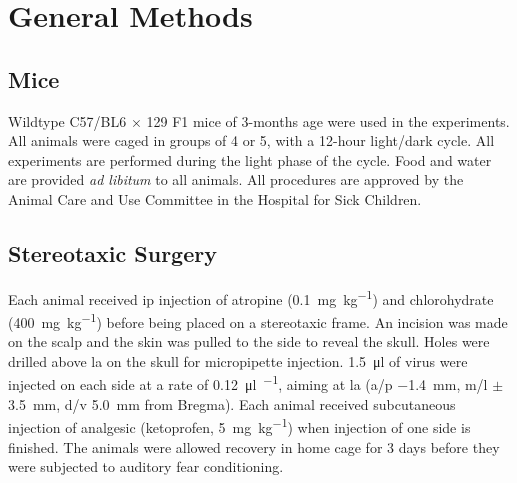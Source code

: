 \chapter{General Methods}
\section{Mice}
Wildtype C57/BL6 $\times$ 129 F1 mice of 3-months age were used in the experiments. All animals were caged in groups of 4 or 5, with a 12-hour light/dark cycle. All experiments are performed during the light phase of the cycle. Food and water are provided \textit{ad libitum} to all animals. All procedures are approved by the Animal Care and Use Committee in the Hospital for Sick Children.

\section{Stereotaxic Surgery}
Each animal received \gls{ip} injection of atropine (\SI{0.1}{\mg\per\kg}) and chlorohydrate (\SI{400}{\mg\per\kg}) before being placed on a stereotaxic frame. An incision was made on the scalp and the skin was pulled to the side to reveal the skull. Holes were drilled above \gls{la} on the skull for micropipette injection. \SI{1.5}{\ul} of virus were injected on each side at a rate of \SI{0.12}{\ul\per\min}, aiming at \gls{la} (\gls{a/p} \SI{-1.4}{\mm}, \gls{m/l} $\pm$\SI{3.5}{\mm}, \gls{d/v} \SI{5.0}{\mm} from Bregma). Each animal received subcutaneous injection of analgesic (ketoprofen, \SI{5}{\mg\per\kg}) when injection of one side is finished. The animals were allowed recovery in home cage for 3 days before they were subjected to auditory fear conditioning.
